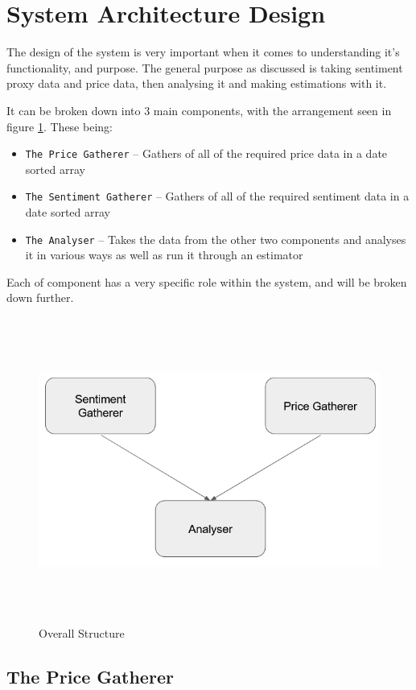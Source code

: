 \section{System Architecture Design}

The design of the system is very important when it comes to understanding it's functionality, and purpose. The general purpose as discussed is taking sentiment proxy data and price data, then analysing it and making estimations with it.

It can be broken down into 3 main components, with the arrangement seen in figure \ref{fig:overallstructure}. These being:
\begin{itemize}
    \item \texttt{The Price Gatherer} -- Gathers of all of the required price data in a date sorted array
    \item \texttt{The Sentiment Gatherer} -- Gathers of all of the required sentiment data in a date sorted array
    \item \texttt{The Analyser} -- Takes the data from the other two components and analyses it in various ways as well as run it through an estimator
\end{itemize}
Each of component has a very specific role within the system, and will be broken down further.
\begin{figure}[h]
    \centering
    \includegraphics[width=15cm,height=10cm,keepaspectratio]{design/OverallStructure.png}
    \caption{Overall Structure}
    \label{fig:overallstructure}
\end{figure}

\subsection{The Price Gatherer}

